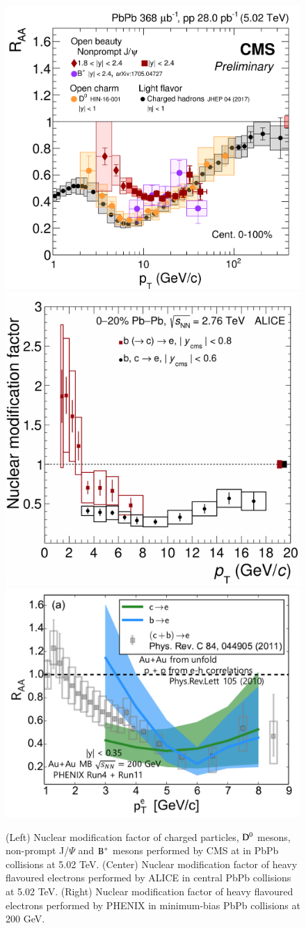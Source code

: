 \documentclass{webofc}
\begin{document}
\begin{figure}[ht]
\centering
\includegraphics[width=.32\textwidth]{Plots/DBNonPromptRAACMS}
\includegraphics[width=.30\textwidth]{Plots/HFelectronsALICE}
\includegraphics[width=.36\textwidth]{Plots/BPHENIXAuAu}
\caption{(Left) Nuclear modification factor of charged particles, $\rm D^{0}$ mesons, non-prompt J/$\Psi$ and $\rm B^{+}$ mesons performed by CMS at in PbPb collisions at 5.02 TeV.
(Center) Nuclear modification factor of heavy flavoured electrons performed by ALICE in central PbPb collisions at 5.02 TeV. (Right) Nuclear modification factor of 
heavy flavoured electrons performed by PHENIX in minimum-bias PbPb collisions at 200 GeV.}
\label{fig:FlavourRAA}     
\end{figure}
\end{document}
